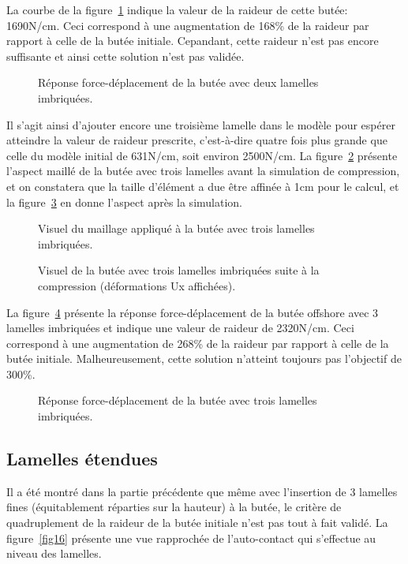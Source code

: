 ﻿\documentclass{article}
\begin{document}
La courbe de la figure~\ref{fig12} indique la valeur de la raideur de cette butée: 1690N/cm. Ceci correspond à une augmentation de 168\% de la raideur par rapport à celle de la butée initiale. Cepandant, cette raideur n'est pas encore suffisante et ainsi cette solution n'est pas validée.
 
\begin{figure}[!h]
	\centering
	\caption{Réponse force-déplacement de la butée avec deux lamelles imbriquées.}
	\label{fig12}
\end{figure}

Il s'agit ainsi d'ajouter encore une troisième lamelle dans le modèle pour espérer atteindre la valeur de raideur prescrite, c'est-à-dire quatre fois plus grande que celle du modèle initial de 631N/cm, soit environ 2500N/cm. La figure~\ref{fig13} présente l'aspect maillé de la butée avec trois lamelles avant la simulation de compression, et on constatera que la taille d'élément a due être affinée à 1cm pour le calcul, et la figure~\ref{fig14} en donne l'aspect après la simulation.

\begin{figure}[!h]
	\centering
	\caption{Visuel du maillage appliqué à la butée avec trois lamelles imbriquées.}
	\label{fig13}
\end{figure}

\begin{figure}[!h]
	\centering
	\caption{Visuel de la butée avec trois lamelles imbriquées suite à la compression (déformations Ux affichées).}
	\label{fig14}
\end{figure}

La figure~\ref{fig15} présente la réponse force-déplacement de la butée offshore avec 3 lamelles imbriquées et indique une valeur de raideur de 2320N/cm. Ceci correspond à une augmentation de 268\% de la raideur par rapport à celle de la butée initiale. Malheureusement, cette solution n'atteint toujours pas l'objectif de 300\%.
 
\begin{figure}[!h]
	\centering
	\caption{Réponse force-déplacement de la butée avec trois lamelles imbriquées.}
	\label{fig15}
\end{figure}

\subsection{Lamelles étendues}
Il a été montré dans la partie précédente que même avec l'insertion de 3 lamelles fines (équitablement réparties sur la hauteur) à la butée, le critère de quadruplement de la raideur de la butée initiale n'est pas tout à fait validé. La figure~\ref{fig16} présente une vue rapprochée de l'auto-contact qui s'effectue au niveau des lamelles.
\end{document}
